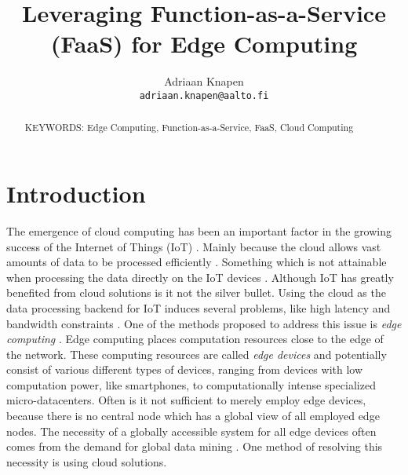 \documentclass[article]{aaltoseries}
\begin{document}
 

\title{Leveraging Function-as-a-Service (FaaS) for Edge Computing}

\author{Adriaan Knapen%
\\\textnormal{\texttt{adriaan.knapen@aalto.fi}}} %


\maketitle


\begin{abstract}

\vspace{3mm}
\noindent KEYWORDS: Edge Computing, Function-as-a-Service, FaaS, Cloud Computing

\end{abstract}


\section{Introduction}
The emergence of cloud computing has been an important factor in the growing success of the Internet of Things (IoT) \cite{shi_promise_2016}.
Mainly because the cloud allows vast amounts of data to be processed efficiently \cite{shi_promise_2016}.
Something which is not attainable when processing the data directly on the IoT devices  \cite{shi_promise_2016}.
Although IoT has greatly benefited from cloud solutions is it not the silver bullet. %
Using the cloud as the data processing backend for IoT induces several problems, like high latency and bandwidth constraints \cite{shi_edge_2016}.
One of the methods proposed to address this issue is \emph{edge computing} \cite{shi_edge_2016}.
Edge computing places computation resources close to the edge of the network\cite{shi_promise_2016}.
These computing resources are called \emph{edge devices} and potentially consist of various different types of devices, ranging from devices with low computation power, like smartphones, to computationally intense specialized micro-datacenters\cite{shi_promise_2016}.
Often is it not sufficient to merely employ edge devices, because there is no central node which has a global view of all employed edge nodes.
The necessity of a globally accessible system for all edge devices often comes from the demand for global data mining \cite{bonomi_fog_2012}.
One method of resolving this necessity is using cloud solutions.
\end{document}
